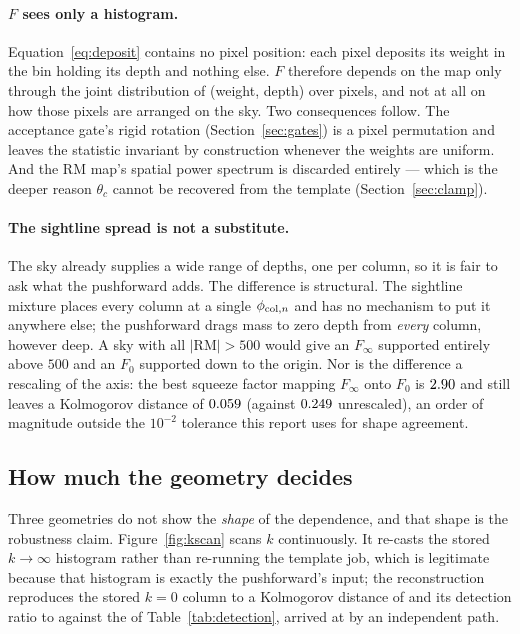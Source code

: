 \documentclass[11pt]{article}
\begin{document}
\paragraph{$F$ sees only a histogram.} Equation~\eqref{eq:deposit}
contains no pixel position: each pixel deposits its weight in the bin
holding its depth and nothing else. $F$ therefore depends on the map
only through the joint distribution of (weight, depth) over pixels, and
not at all on how those pixels are arranged on the sky. Two
consequences follow. The acceptance gate's rigid rotation
(Section~\ref{sec:gates}) is a pixel permutation and leaves the
statistic invariant by construction whenever the weights are uniform.
And the RM map's spatial power spectrum is discarded entirely --- which
is the deeper reason $\theta_c$ cannot be recovered from the template
(Section~\ref{sec:clamp}).

\paragraph{The sightline spread is not a substitute.} The sky already
supplies a wide range of depths, one per column, so it is fair to ask
what the pushforward adds. The difference is structural. The sightline
mixture places every column at a single $\phi_{{\rm col},n}$ and has no
mechanism to put it anywhere else; the pushforward drags mass to zero
depth from \emph{every} column, however deep. A sky with all
$|\mathrm{RM}|>500$ would give an $F_{\infty}$ supported entirely above
$500$ and an $F_{0}$ supported down to the origin. Nor is the
difference a rescaling of the axis: the best squeeze factor mapping
$F_{\infty}$ onto $F_{0}$ is $2.90$ and still leaves a
Kolmogorov distance of $0.059$ (against
$0.249$ unrescaled), an order of magnitude outside the
$10^{-2}$ tolerance this report uses for shape agreement.

\subsection{How much the geometry decides}
\label{sec:kscan}

Three geometries do not show the \emph{shape} of the dependence, and
that shape is the robustness claim. Figure~\ref{fig:kscan} scans $k$
continuously. It re-casts the stored $k\to\infty$ histogram rather than
re-running the template job, which is legitimate because that histogram
is exactly the pushforward's input; the reconstruction reproduces the
stored $k=0$ column to a Kolmogorov distance of \kscanKSThirty{} and
its detection ratio to \kscanRatioZeroThirty{} against the
\detSafeSlabThirty{} of Table~\ref{tab:detection}, arrived at by an
independent path.
\end{document}
